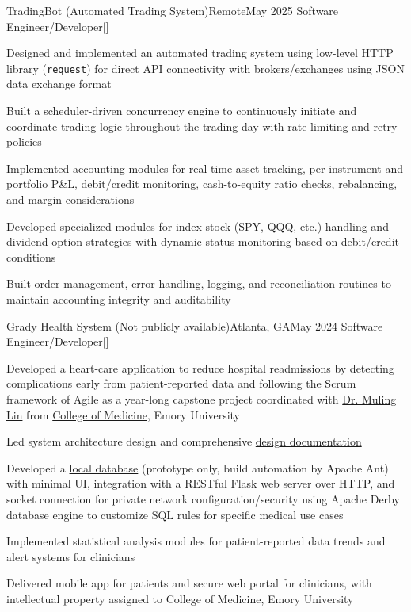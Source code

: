 \begin{resume-itemize}
  {TradingBot (Automated Trading System)}{Remote}{May 2025}
  {Software Engineer/Developer}[\href{https://github.com/YundaeLeeSong/ydjs-references/tree/main/project2505-app_tradingbot}{}]
  \item Designed and implemented an automated trading system using low-level HTTP library (\texttt{request}) 
  for direct API connectivity with brokers/exchanges using JSON data exchange format
  \item Built a scheduler-driven concurrency engine to continuously initiate and coordinate trading logic 
  throughout the trading day with rate-limiting and retry policies
  \item Implemented accounting modules for real-time asset tracking, per-instrument and portfolio P\&L, 
  debit/credit monitoring, cash-to-equity ratio checks, rebalancing, and margin considerations
  \item Developed specialized modules for index 
  stock (SPY, QQQ, etc.) handling and dividend option strategies 
  with dynamic status monitoring based on debit/credit conditions
  \item Built order management, error handling, logging, and reconciliation routines 
  to maintain accounting integrity and auditability
\end{resume-itemize}
\begin{resume-itemize}
  {Grady Health System (Not publicly available)}{Atlanta, GA}{May 2024}
  {Software Engineer/Developer}[]
  \item Developed a heart-care application to reduce hospital readmissions by detecting complications early 
  from patient-reported data and following the Scrum framework of Agile as a year-long capstone project coordinated with 
  \href{https://www.doximity.com/pub/muling-lin-md-bec64b54}{Dr. Muling Lin} from 
  \href{https://med.emory.edu/departments/medicine/_documents/resident-photo-book-2022-2023.pdf}{College of Medicine}, Emory University
  \item Led system architecture design and comprehensive 
  \href{https://yundaeleesong.github.io/project2405-server_derbyDB-docs.pdf}{design documentation}
  \item Developed a \href{https://github.com/YundaeLeeSong/ydjs-references/tree/main/project2405-server_derbyDB}{local database}
  (prototype only, build automation by Apache Ant) with minimal UI, integration with a RESTful Flask web server over HTTP, and socket connection for private network configuration/security 
  using Apache Derby database engine to customize SQL rules for specific medical use cases
  \item Implemented statistical analysis modules for patient-reported data trends and alert systems for clinicians
  \item Delivered mobile app for patients and secure web portal for clinicians, 
  with intellectual property assigned to College of Medicine, Emory University
\end{resume-itemize}
